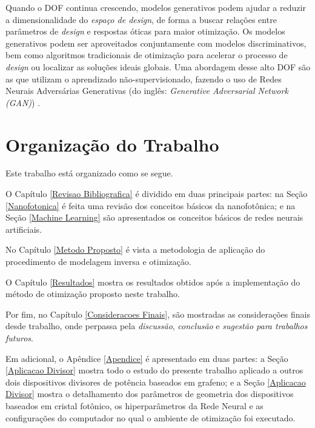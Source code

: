 Quando o DOF continua crescendo, modelos generativos podem ajudar a reduzir a dimensionalidade do \textit{espaço de design}, de forma a buscar relações entre parâmetros de \textit{design} e respostas óticas para maior otimização. Os modelos generativos podem ser aproveitados conjuntamente com modelos discriminativos, bem como algoritmos tradicionais de otimização para acelerar o processo de \textit{design} ou localizar as soluções ideais globais. Uma abordagem desse alto DOF são as que utilizam o aprendizado não-supervisionado, fazendo o uso de Redes Neurais Adversárias Generativas (do inglês: \textit{Generative Adversarial Network (GAN)}) \cite{SoRho201912551261}.


\section{Organização do Trabalho}

Este trabalho está organizado como se segue.

O Capítulo \ref{Revisao Bibliografica} é dividido em duas principais partes: na Seção \ref{Nanofotonica} é feita uma revisão dos conceitos básicos da nanofotônica; e na Seção \ref{Machine Learning} são apresentados os conceitos básicos de redes neurais artificiais.

No Capítulo \ref{Metodo Proposto} é vista a metodologia de aplicação do procedimento de modelagem inversa e otimização.

O Capítulo \ref{Resultados} mostra os resultados obtidos após a implementação do método de otimização proposto neste trabalho.

Por fim, no Capítulo \ref{Consideracoes Finais}, são mostradas as considerações finais desde trabalho, onde perpassa pela \textit{discussão}, \textit{conclusão} e \textit{sugestão para trabalhos futuros}.

Em adicional, o Apêndice \ref{Apendice} é apresentado em duas partes: a Seção \ref{Aplicacao Divisor} mostra todo o estudo do presente trabalho aplicado a outros dois dispositivos divisores de potência baseados em grafeno; e a Seção \ref{Aplicacao Divisor} mostra o detalhamento dos parâmetros de geometria dos dispositivos baseados em cristal fotônico, os hiperparâmetros da Rede Neural e as configurações do computador no qual o ambiente de otimização foi executado.